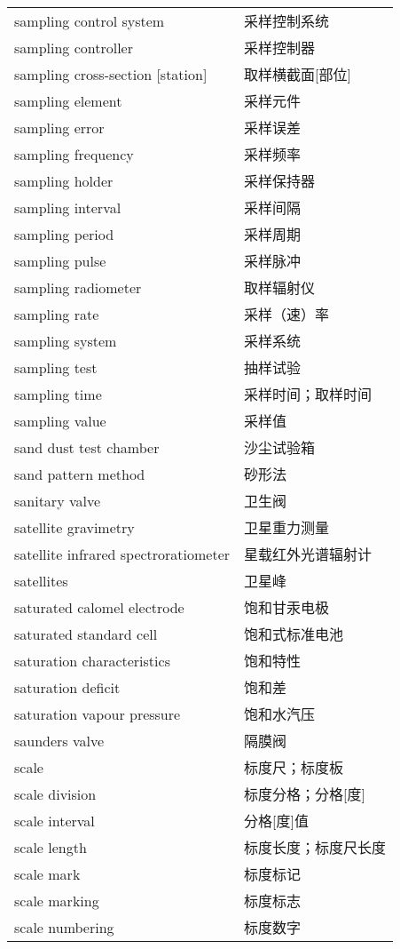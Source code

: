 \documentclass[
]{article}
\begin{document}
\begin{longtable}[]{@{}ll@{}}
sampling control system & 采样控制系统 \\
sampling controller & 采样控制器 \\
sampling cross-section {[}station{]} & 取样横截面{[}部位{]} \\
sampling element & 采样元件 \\
sampling error & 采样误差 \\
sampling frequency & 采样频率 \\
sampling holder & 采样保持器 \\
sampling interval & 采样间隔 \\
sampling period & 采样周期 \\
sampling pulse & 采样脉冲 \\
sampling radiometer & 取样辐射仪 \\
sampling rate & 采样（速）率 \\
sampling system & 采样系统 \\
sampling test & 抽样试验 \\
sampling time & 采样时间；取样时间 \\
sampling value & 采样值 \\
sand dust test chamber & 沙尘试验箱 \\
sand pattern method & 砂形法 \\
sanitary valve & 卫生阀 \\
satellite gravimetry & 卫星重力测量 \\
satellite infrared spectroratiometer & 星载红外光谱辐射计 \\
satellites & 卫星峰 \\
saturated calomel electrode & 饱和甘汞电极 \\
saturated standard cell & 饱和式标准电池 \\
saturation characteristics & 饱和特性 \\
saturation deficit & 饱和差 \\
saturation vapour pressure & 饱和水汽压 \\
saunders valve & 隔膜阀 \\
scale & 标度尺；标度板 \\
scale division & 标度分格；分格{[}度{]} \\
scale interval & 分格{[}度{]}值 \\
scale length & 标度长度；标度尺长度 \\
scale mark & 标度标记 \\
scale marking & 标度标志 \\
scale numbering & 标度数字 \\

\end{longtable}
\end{document}

